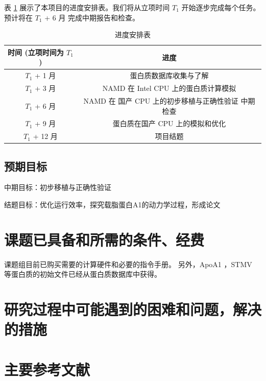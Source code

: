 表 \ref{tab:progress} 展示了本项目的进度安排表。我们将从立项时间 $T_1$ 开始逐步完成每个任务。预计将在 $T_1$ + 6 月 完成中期报告和检查。

\begin{table}[h]
    \centering
    \caption{进度安排表}
    \label{tab:progress}
    \begin{tabular}{cc}
        \toprule
        时间 (立项时间为 $T_1$) & 进度                              \\
        \midrule
        $T_1$ + 1 月      & 蛋白质数据库收集与了解                     \\
        $T_1$ + 3 月      & NAMD 在 Intel CPU 上的蛋白质计算模拟      \\
        $T_1$ + 6 月      & NAMD 在 国产 CPU 上的初步移植与正确性验证 中期检查 \\
        $T_1$ + 9 月      & 蛋白质在国产 CPU 上的模拟和优化              \\
        $T_1$ + 12 月     & 项目结题                            \\
        \bottomrule
    \end{tabular}
\end{table}

\subsection{预期目标}

中期目标：初步移植与正确性验证

结题目标：优化运行效率，探究载脂蛋白A1的动力学过程，形成论文

\section{课题已具备和所需的条件、经费}

课题组目前已购买需要的计算硬件和必要的指令手册。
另外，ApoA1 ，STMV 等蛋白质的初始文件已经从蛋白质数据库中获得。

\section{研究过程中可能遇到的困难和问题，解决的措施}


\section{主要参考文献}



